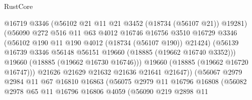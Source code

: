 \begin{lexlean}{RustCore}
\begin{coremodule}
                                      @16719
                                      @3346
                                      (@56102 @21 @11 @21 @3452 (@18734 (@56107 @21)) @19281)
                                      (@56090
                                        @272
                                        @516
                                        @11
                                        @63
                                        @4012
                                        @16746
                                        @16756
                                        @3510
                                        @16729
                                        @3346
                                        (@56102 @190 @11 @190 @4012 (@18734 (@56107 @190)) @21424)
                                        (@56139
                                          @16739
                                          @3346
                                          @56148
                                          @56151
                                          @19660
                                          (@18885 (@19662 @16740 @3352)))
                                        @19660
                                        (@18885 (@19662 @16730 @16746)))
                                      @19660
                                      (@18885 (@19662 @16720 @16747)))
                                    @21626
                                    @21629
                                    @21632
                                    @21636
                                    @21641
                                    @21647))
                                (@56067
                                  @2979
                                  @2984
                                  @11
                                  @67
                                  @16810
                                  @16863
                                  (@56075
                                    @2979
                                    @11
                                    @16796
                                    @16808
                                    (@56082
                                      @2978
                                      @65
                                      @11
                                      @16796
                                      @16806
                                      @4059
                                      (@56090
                                        @219
                                        @2898
                                        @11

\end{coremodule}
\end{lexlean}
